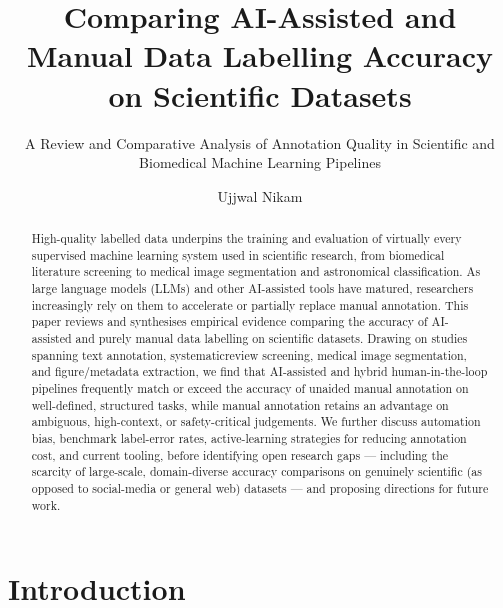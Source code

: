 \documentclass[acmsmall,nonacm]{acmart}
\title{Comparing AI-Assisted and Manual Data Labelling Accuracy on Scientific Datasets}
\subtitle{A Review and Comparative Analysis of Annotation Quality in Scientific and Biomedical Machine Learning Pipelines}
\author{Ujjwal Nikam}
\affiliation{%
  \institution{IIIT Allahabad}
  \country{\relax}
}
\begin{document}
\begin{abstract}
High-quality labelled data underpins the training and evaluation of virtually every supervised machine learning system used in scientific research, from biomedical literature screening to medical image segmentation and astronomical classification. As large language models (LLMs) and other AI-assisted tools have matured, researchers increasingly rely on them to accelerate or partially replace manual annotation. This paper reviews and synthesises empirical evidence comparing the accuracy of AI-assisted and purely manual data labelling on scientific datasets. Drawing on studies spanning text annotation, systematicreview screening, medical image segmentation, and figure/metadata extraction, we find that AI-assisted and hybrid human-in-the-loop pipelines frequently match or exceed the accuracy of unaided manual annotation on well-defined, structured tasks, while manual annotation retains an advantage on ambiguous, high-context, or safety-critical judgements. We further discuss automation bias, benchmark label-error rates, active-learning strategies for reducing annotation cost, and current tooling, before identifying open research gaps --- including the scarcity of large-scale, domain-diverse accuracy comparisons on genuinely scientific (as opposed to social-media or general web) datasets --- and proposing directions for future work.
\end{abstract}


\nocite{alathba2026cohesion,chelli2024hallucination,chen2025human,chen2024quality,delgadochaves2025large,dreizin2023accelerating,gilardi2023chatgpt,khraisha2023large,mahmoudi2025critical,northcutt2021pervasive,northcutt2021confident,settles2009active,siegel2018extracting,turner2025large,validation2025llama,yamagata2024survey}

\maketitle

\section{Introduction}
\label{sec:introduction}
\end{document}
